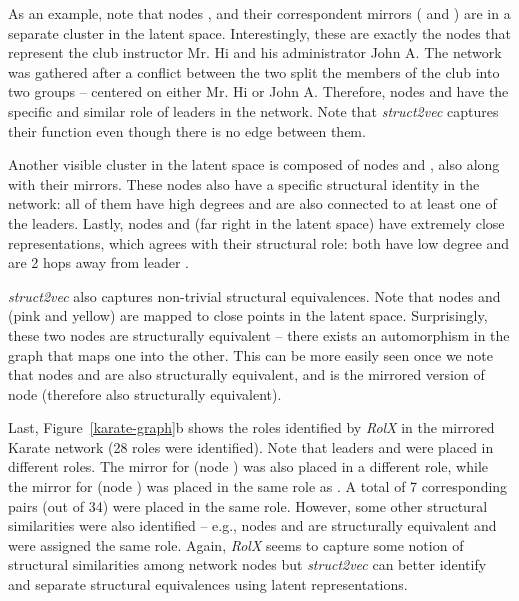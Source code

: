 \documentclass[sigconf]{acmart}
\begin{document}
As an example, note that nodes ,  and their correspondent mirrors ( and ) are in a separate cluster in the latent space. Interestingly, these are exactly the nodes that represent the club instructor Mr. Hi and his administrator John A. The network was gathered after a conflict between the two split the members of the club into two groups -- centered on either Mr. Hi or John A. Therefore, nodes  and  have the specific and similar role of leaders in the network. Note that \textit{struct2vec} captures their function even though there is no edge between them.

Another visible cluster in the latent space is composed of nodes  and , also along with their mirrors. These nodes also have a specific structural identity in the network: all of them have high degrees and are also connected to at least one of the leaders. Lastly, nodes  and  (far right in the latent space) have extremely close representations, which agrees with their structural role: both have low degree and are 2 hops away from leader .

\textit{struct2vec} also captures non-trivial structural equivalences. Note that nodes  and  (pink and yellow) are mapped to close points in the latent space. Surprisingly, these two nodes are structurally equivalent -- there exists an automorphism in the graph that maps one into the other. This can be more easily seen once we note that nodes  and  are also structurally equivalent, and  is the mirrored version of node  (therefore also structurally equivalent). 



Last, Figure~\ref{karate-graph}b shows the roles identified by \textit{RolX} in the mirrored Karate network (28 roles were identified). Note that leaders  and  were placed in different roles. The mirror for  (node ) was also placed in a different role, while the mirror for  (node ) was placed in the same role as . A total of 7 corresponding pairs (out of 34) were placed in the same role. However, some other structural similarities were also identified -- e.g., nodes  and  are structurally equivalent and were assigned the same role. Again, \textit{RolX} seems to capture some notion of structural similarities among network nodes but \textit{struct2vec} can better identify and separate structural equivalences using latent representations. 
\end{document}
